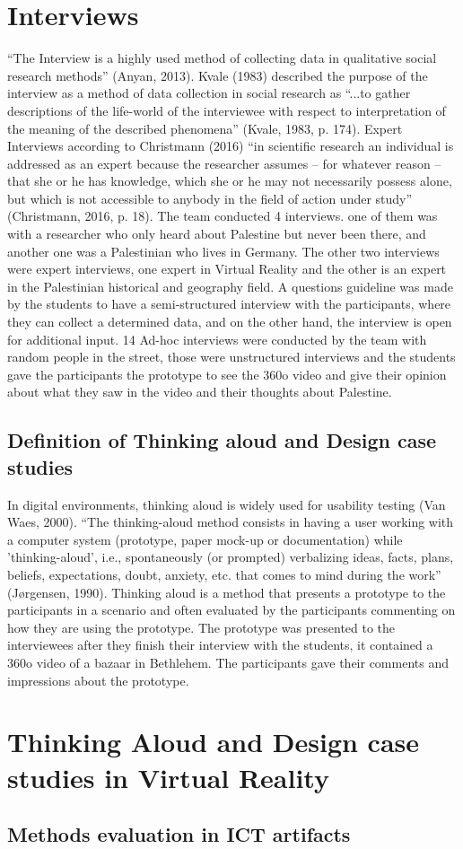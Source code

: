 \section{Interviews}

“The Interview is a highly used method of collecting data in qualitative social research methods” (Anyan, 2013). Kvale (1983) described the purpose of the interview as a method of data collection in social research as “...to gather descriptions of the life-world of the interviewee with respect to interpretation of the meaning of the described phenomena” (Kvale, 1983, p. 174). Expert Interviews according to Christmann (2016) “in scientific research an individual is addressed as an expert because the researcher assumes – for whatever reason – that she or he has knowledge, which she or he may not necessarily possess alone, but which is not accessible to anybody in the field of action under study” (Christmann, 2016, p. 18). The team conducted 4 interviews. one of them was with a researcher who only heard about Palestine but never been there, and another one was a Palestinian who lives in Germany. The other two interviews were expert interviews, one expert in Virtual Reality and the other is an expert in the Palestinian historical and geography field. A questions guideline was made by the students to have a semi-structured interview with the participants, where they can collect a determined data, and on the other hand, the interview is open for additional input. 14 Ad-hoc interviews were conducted by the team with random people in the street, those were unstructured interviews and the students gave the participants the prototype to see the 360o video and give their opinion about what they saw in the video and their thoughts about Palestine.


\subsection{Definition of Thinking aloud and Design case studies}

In digital environments, thinking aloud is widely used for usability testing (Van Waes, 2000). “The thinking-aloud method consists in having a user working with a computer system (prototype, paper mock-up or documentation) while 'thinking-aloud', i.e., spontaneously (or prompted) verbalizing ideas, facts, plans, beliefs, expectations, doubt, anxiety, etc. that comes to mind during the work” (Jørgensen, 1990). Thinking aloud is a method that presents a prototype to the participants in a scenario and often evaluated by the participants commenting on how they are using the prototype. The prototype was presented to the interviewees after they finish their interview with the students, it contained a 360o video of a bazaar in Bethlehem. The participants gave their comments and impressions about the prototype.


\section{Thinking Aloud and Design case studies in Virtual Reality}






\subsection{Methods evaluation in ICT artifacts}


